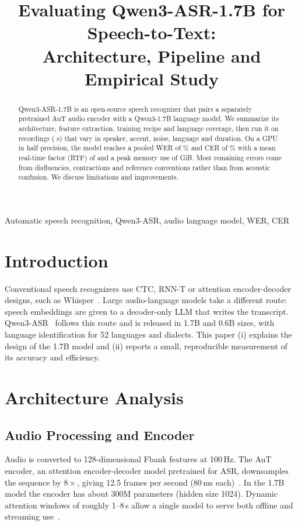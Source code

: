 \documentclass[conference]{IEEEtran}
\begin{document}
\title{Evaluating Qwen3-ASR-1.7B for Speech-to-Text:\\Architecture, Pipeline and Empirical Study}

\maketitle

\begin{abstract}
Qwen3-ASR-1.7B is an open-source speech recognizer that pairs a separately pretrained AuT audio encoder with a Qwen3-1.7B language model. We summarize its architecture, feature extraction, training recipe and language coverage, then run it on \nfiles{} recordings (\totaldur{} s) that vary in speaker, accent, noise, language and duration. On a \hwname{} GPU in half precision, the model reaches a pooled WER of \poolwer\% and CER of \poolcer\% with a mean real-time factor (RTF) of \meanrtf{} and a peak memory use of \vrampeak{} GiB. Most remaining errors come from disfluencies, contractions and reference conventions rather than from acoustic confusion. We discuss limitations and improvements.
\end{abstract}
\begin{IEEEkeywords}Automatic speech recognition, Qwen3-ASR, audio language model, WER, CER\end{IEEEkeywords}

\section{Introduction}
Conventional speech recognizers use CTC, RNN-T or attention encoder-decoder designs, such as Whisper~\cite{whisper}. Large audio-language models take a different route: speech embeddings are given to a decoder-only LLM that writes the transcript. Qwen3-ASR~\cite{qwen3asr} follows this route and is released in 1.7B and 0.6B sizes, with language identification for 52 languages and dialects. This paper (i) explains the design of the 1.7B model and (ii) reports a small, reproducible measurement of its accuracy and efficiency.

\section{Architecture Analysis}
\subsection{Audio Processing and Encoder}
Audio is converted to 128-dimensional Fbank features at 100\,Hz. The AuT encoder, an attention encoder-decoder model pretrained for ASR, downsamples the sequence by $8\times$, giving 12.5 frames per second (80\,ms each)~\cite{qwen3asr,qwen3omni}. In the 1.7B model the encoder has about 300M parameters (hidden size 1024). Dynamic attention windows of roughly 1--8\,s allow a single model to serve both offline and streaming use~\cite{qwen3asr}.
\end{document}
